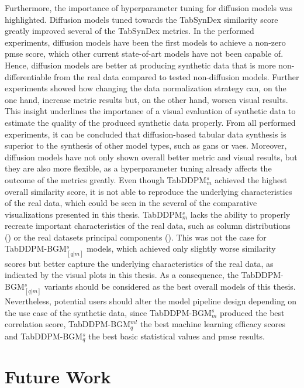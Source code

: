 Furthermore, the importance of hyperparameter tuning for diffusion models was highlighted.
Diffusion models tuned towards the TabSynDex similarity score greatly improved several of the TabSynDex metrics.
In the performed experiments, diffusion models have been the first models to achieve a non-zero \gls{pmse} score, which other current state-of-art models have not been capable of.
Hence, diffusion models are better at producing synthetic data that is more non-differentiable from the real data \cite{chundawat2022UniversalMetricRobust} compared to tested non-diffusion models.
Further experiments showed how changing the data normalization strategy can, on the one hand, increase metric results but, on the other hand, worsen visual results.
This insight underlines the importance of a visual evaluation of synthetic data to estimate the quality of the produced synthetic data properly.
From all performed experiments, it can be concluded that diffusion-based tabular data synthesis is superior to the synthesis of other model types, such as \glspl{gan} or \glspl{vae}.
Moreover, diffusion models have not only shown overall better metric and visual results, but they are also more flexible, as a hyperparameter tuning already affects the outcome of the metrics greatly.
Even though TabDDPM$^{s}_{m}$ achieved the highest overall similarity score, it is not able to reproduce the underlying characteristics of the real data, which could be seen in the several of the comparative visualizations presented in this thesis.
TabDDPM$^{s}_{m}$ lacks the ability to properly recreate important characteristics of the real data, such as column distributions () or the real datasets principal components ().
This was not the case for TabDDPM-BGM$^{s}_{[q|m]}$ models, which achieved only slightly worse similarity scores but better capture the underlying characteristics of the real data, as indicated by the visual plots in this thesis.
As a consequence, the TabDDPM-BGM$^{s}_{[q|m]}$ variants should be considered as the best overall models of this thesis.
Nevertheless, potential users should alter the model pipeline design depending on the use case of the synthetic data, since TabDDPM-BGM$^{s}_m$ produced the best correlation score, TabDDPM-BGM$^{ml}_q$ the best machine learning efficacy scores and TabDDPM-BGM$^{s}_q$ the best basic statistical values and \gls{pmse} results.
\newpage

\section{Future Work}
\label{ch:results-futureWork}

